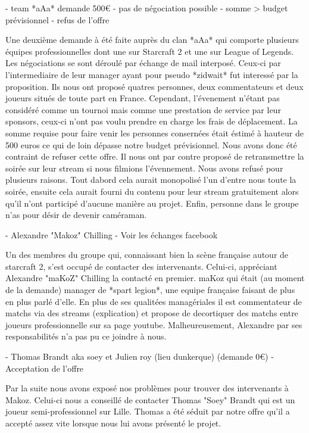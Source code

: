 - team *aAa* demande 500€
                - pas de négociation possible
                - somme > budget prévisionnel
                - refus de l'offre

Une deuxième demande à été faite auprès du clan *aAa* qui comporte
plusieurs équipes professionnelles dont une sur Starcraft 2 et une sur
League of Legends. Les négociations se sont déroulé par échange de mail
interposé.  Ceux-ci par l'intermediaire de leur manager ayant pour
pseudo *zidwait* fut interessé par la proposition. Ils nous ont proposé
quatres personnes, deux commentateurs et deux joueurs situés de toute
part en France. Cependant, l'évenement n'étant pas considéré comme un
tournoi mais comme une prestation de service par leur sponsors, ceux-ci
n'ont pas voulu prendre en charge les frais de déplacement. La somme
requise pour faire venir les personnes consernées était éstimé à hauteur
de 500 euros ce qui de loin dépasse notre budget prévisionnel. Nous
avons donc été contraint de refuser cette offre. Il nous ont par contre
proposé de retransmettre la soirée sur leur stream si nous filmions
l'évennement. Nous avons refusé pour plusieurs raisons. Tout dabord cela
aurait monopolisé l'un d'entre nous toute la soirée, ensuite cela aurait
fourni du contenu pour leur stream gratuitement alors qu'il n'ont
participé d'aucune manière au projet. Enfin, personne dans le groupe
n'as pour désir de devenir caméraman.

- Alexandre "Makoz" Chilling
  - Voir les échanges facebook

Un des membres du groupe qui, connaissant bien la scène française autour
de starcraft 2, s'est occupé de contacter des intervenants.  Celui-ci,
appréciant Alexandre "maKoZ" Chilling la contacté en premier.  maKoz qui
était (au moment de la demande) manager de *spart legion*, une equipe
française faisant de plus en plus parlé d'elle. En plus de ses qualitées
managériales il est commentateur de matchs via des streams (explication)
et propose de decortiquer des matchs entre joueurs professionnelle sur
sa page youtube. Malheureusement, Alexandre par ses responsabilités n'a
pas pu ce joindre à nous.

- Thomas Brandt aka soey et Julien roy (lieu dunkerque) (demande 0€)
    - Acceptation de l'offre

Par la suite nous avons exposé nos problèmes pour trouver des
intervenants à Makoz. Celui-ci nous a conseillé de contacter Thomas
"Soey" Brandt qui est un joueur semi-professionnel sur Lille. Thomas a
été séduit par notre offre qu'il a accepté assez vite lorsque nous lui
avons présenté le projet.

